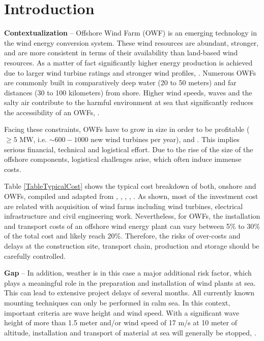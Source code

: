 \section{Introduction}
\label{Sec-Introduction}
\textbf{Contextualization} --
Offshore Wind Farm (OWF) is an emerging technology in the wind energy conversion system. These wind resources are abundant, stronger, and are more consistent in terms of their availability than land-based wind resources. As a matter of fact significantly higher energy production is achieved due to larger wind turbine ratings and stronger wind profiles, \cite{Sun2012298}. Numerous OWFs are commonly built in comparatively deep water (20 to 50 meters) and far distances (30 to 100 kilometers) from shore. Higher wind speeds, waves and the salty air contribute to the harmful environment at sea that significantly reduces the accessibility of an OWFs, \cite{Smit2007}.

Facing these constraints, OWFs have to grow in size in order to be profitable ($\geq 5$ MW, i.e. $\sim600-1000$ new wind turbines per year), \cite{EWEA2011} and \cite{Kaldellis2013}. This implies serious financial, technical and logistical effort. Due to the rise of the size of the offshore components, logistical challenges arise, which often induce immense costs.

Table \ref{TableTypicalCost} shows the typical cost breakdown of both, onshore and OWFs, compiled and adapted from \cite{Henderson2003}, \cite{Junginger2004}, \cite{UK10}, \cite{TCE12}, \cite{IRENA12}. As shown, most of the investment cost are related with acquisition of wind farms including wind turbines, electrical infrastructure and civil engineering work. Nevertheless, for OWFs, the installation and transport costs of an offshore wind energy plant can vary between 5\% to 30\% of the total cost and likely reach 20\%. Therefore, the risks of over-costs and delays at the construction site, transport chain, production and storage should be carefully controlled.

\textbf{Gap} --
In addition, weather is in this case a major additional risk factor, which plays a meaningful role in the preparation and installation of wind plants at sea. This can lead to extensive project delays of several months. All currently known mounting techniques can only be performed in calm sea. In this context, important criteria are wave height and wind speed. With a significant wave height of more than 1.5 meter and/or wind speed of 17 m/s at 10 meter of altitude, installation and transport of material at sea will generally be stopped, \cite{aitsimulation}.

